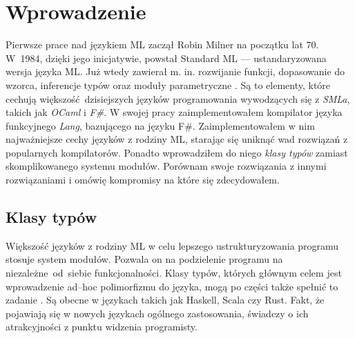 \documentclass[declaration,shortabstract]{iithesis}
\author         {Mateusz Lewko}
\date          {}                     %
\begin{document}

\chapter{Wprowadzenie}

Pierwsze prace nad językiem ML zaczął Robin Milner na początku lat 70. W~1984, 
dzięki jego inicjatywie, powstał Standard ML --- ustandaryzowana wersja języka 
ML. Już wtedy zawierał m. in. rozwijanie funkcji, dopasowanie do wzorca, 
inferencje typów oraz moduły parametryczne \cite{sml_proposal}. Są to elementy,
które cechują większość dzisiejszych języków programowania 
wywodzących się z \textit{SMLa}, takich jak \textit{OCaml} i \textit{F\#}. W 
swojej pracy zaimplementowałem kompilator języka funkcyjnego \textit{Lang}, 
bazującego na języku F\#. Zaimplementowałem w nim najważniejsze cechy języków 
z rodziny ML, starając się uniknąć wad rozwiązań z popularnych kompilatorów. 
Ponadto wprowadziłem do niego \textit{klasy typów} zamiast skomplikowanego 
systemu modułów. Porównam swoje rozwiązania z innymi rozwiązaniami i omówię 
kompromisy na które się zdecydowałem.


\section{Klasy typów}
Większość języków z rodziny ML w celu lepszego ustrukturyzowania
programu stosuje system modułów. Pozwala on na podzielenie programu na 
niezależne~od~siebie funkcjonalności.
Klasy typów, których głównym celem jest wprowadzenie 
ad--hoc polimorfizmu do języka, mogą po części także spełnić to zadanie 
\cite{modules_vs_typeclasses}. 
Są obecne w językach takich jak Haskell, Scala czy Rust. Fakt, że pojawiają się
w nowych językach ogólnego zastosowania, świadczy o ich atrakcyjności z punktu 
widzenia programisty. 

\end{document}
